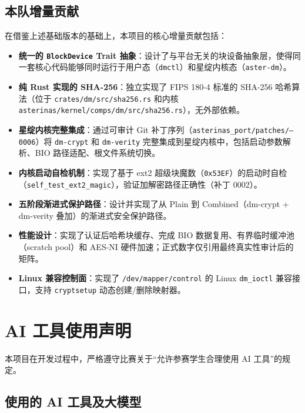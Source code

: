 \subsection{本队增量贡献}

在借鉴上述基础版本的基础上，本项目的核心增量贡献包括：

\begin{itemize}
    \item \textbf{统一的 \texttt{BlockDevice} Trait 抽象}：设计了与平台无关的块设备抽象层，使得同一套核心代码能够同时运行于用户态（\texttt{dmctl}）和星绽内核态（\texttt{aster-dm}）。
    \item \textbf{纯 Rust 实现的 SHA-256}：独立实现了 FIPS 180-4 标准的 SHA-256 哈希算法（位于 \texttt{crates/\allowbreak dm/\allowbreak src/\allowbreak sha256.rs} 和内核 \texttt{asterinas/\allowbreak kernel/\allowbreak comps/\allowbreak dm/\allowbreak src/\allowbreak sha256.rs}），无外部依赖。
    \item \textbf{星绽内核完整集成}：通过可审计 Git 补丁序列（\texttt{asterinas\_\allowbreak port/\allowbreak patches/--0006}）将 \texttt{dm-crypt} 和 \texttt{dm-verity} 完整集成到星绽内核中，包括启动参数解析、BIO 路径适配、根文件系统切换。
    \item \textbf{内核启动自检机制}：实现了基于 ext2 超级块魔数（\texttt{0x53EF}）的启动时自检（\texttt{self\_\allowbreak test\_\allowbreak ext2\_\allowbreak magic}），验证加解密路径正确性（补丁 0002）。
    \item \textbf{五阶段渐进式保护路径}：设计并实现了从 Plain 到 Combined（dm-crypt + dm-verity 叠加）的渐进式安全保护路径。
    \item \textbf{性能设计}：实现了认证后哈希块缓存、完成 BIO 数据复用、有界临时缓冲池（scratch pool）和 AES-NI 硬件加速；正式数字仅引用最终真实性审计后的矩阵。
    \item \textbf{Linux 兼容控制面}：实现了 \texttt{/dev/\allowbreak mapper/\allowbreak control} 的 Linux \texttt{dm\_\allowbreak ioctl} 兼容接口，支持 \texttt{cryptsetup} 动态创建/删除映射器。
\end{itemize}

\section{AI 工具使用声明}

本项目在开发过程中，严格遵守比赛关于“允许参赛学生合理使用 AI 工具”的规定。

\subsection{使用的 AI 工具及大模型}

